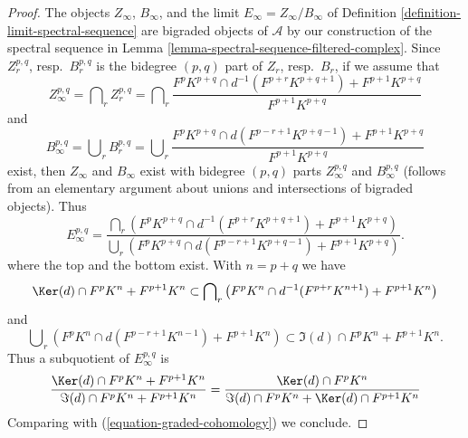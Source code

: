 \begin{proof}
The objects $Z_\infty$, $B_\infty$, and the limit
$E_\infty = Z_\infty/B_\infty$ of
Definition \ref{definition-limit-spectral-sequence}
are bigraded objects of $\mathcal{A}$ by our construction of the
spectral sequence in Lemma \ref{lemma-spectral-sequence-filtered-complex}.
Since $Z_r^{p, q}$, resp.\ $B_r^{p, q}$ is the bidegree $(p, q)$
part of $Z_r$, resp.\ $B_r$, if we assume that
$$
Z_\infty^{p, q} = \bigcap\nolimits_r Z_r^{p, q} =
\bigcap\nolimits_r
\frac{F^pK^{p + q} \cap d^{-1}(F^{p + r}K^{p + q + 1}) + F^{p + 1}K^{p + q}}
{F^{p + 1}K^{p + q}}
$$
and
$$
B_\infty^{p, q} = \bigcup\nolimits_r B_r^{p, q} =
\bigcup\nolimits_r
\frac{F^pK^{p + q} \cap d(F^{p - r + 1}K^{p + q - 1}) + F^{p + 1}K^{p + q}}
{F^{p + 1}K^{p + q}}
$$
exist, then $Z_\infty$ and $B_\infty$ exist with bidegree $(p, q)$
parts $Z_\infty^{p, q}$ and $B_\infty^{p, q}$ (follows from an elementary
argument about unions and intersections of bigraded objects). Thus
$$
E_\infty^{p, q} =
\frac{\bigcap_r (F^pK^{p + q} \cap d^{-1}(F^{p + r}K^{p + q + 1})
+ F^{p + 1}K^{p + q})}
{\bigcup_r (F^pK^{p + q} \cap d(F^{p - r + 1}K^{p + q - 1})
+ F^{p + 1}K^{p + q})}.
$$
where the top and the bottom exist. With $n = p + q$ we have
\begin{equation}
\label{equation-on-top-bigraded}
\Ker(d) \cap F^pK^{n} + F^{p + 1}K^{n}
\subset
\bigcap\nolimits_r
\left(
F^pK^{n} \cap d^{-1}(F^{p + r}K^{n + 1}) + F^{p + 1}K^{n}
\right)
\end{equation}
and
\begin{equation}
\label{equation-at-bottom-bigraded}
\bigcup\nolimits_r
\left(
F^pK^{n} \cap d(F^{p - r + 1}K^{n - 1}) + F^{p + 1}K^{n}
\right)
\subset
\Im(d) \cap F^pK^{n} + F^{p + 1}K^{n}.
\end{equation}
Thus a subquotient of $E_\infty^{p, q}$ is
$$
\frac{\Ker(d) \cap F^pK^{n} + F^{p + 1}K^n}
{\Im(d) \cap F^pK^{n} + F^{p + 1}K^{n}} =
\frac{\Ker(d) \cap F^pK^n}{\Im(d) \cap F^pK^n + \Ker(d) \cap F^{p + 1}K^n}
$$
Comparing with (\ref{equation-graded-cohomology}) we conclude.
\end{proof}


